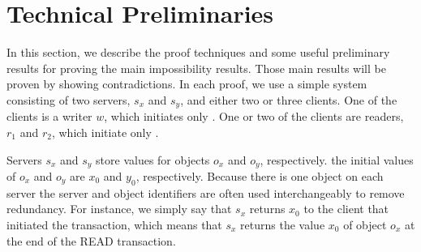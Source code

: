 \section{Technical Preliminaries}
\label{sec:summary}
In this section, we describe the proof techniques and some useful preliminary results for proving the main impossibility results.
Those main results will be proven by showing contradictions.
In each proof, we use a simple system consisting of two servers, $s_x$ and $s_y$, and either two or three clients.
One of the clients is a writer $w$, which initiates only \wots{}.
One or two of the clients are readers, $r_1$ and $r_2$, which initiate only \rots{}.


Servers $s_x$ and $s_y$ store values for objects $o_x$ and $o_y$, respectively.
the initial values of $o_x$ and $o_y$ are $x_0$ and $y_0$, respectively. Because there is one  object on each server  the server and object identifiers are often used interchangeably to remove redundancy. For instance, we simply say that $s_x$ returns $x_0$ to the client that initiated the transaction, which means that $s_x$ returns the value $x_0$ of object $o_x$ at the end of the READ transaction.  
%

